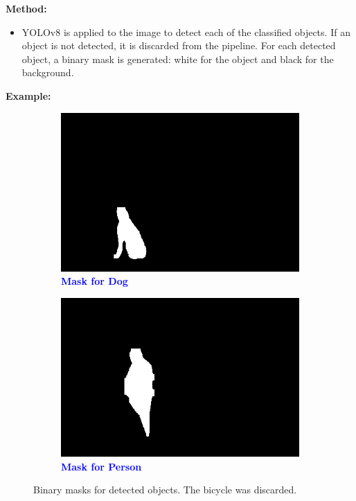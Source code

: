 \documentclass[11pt,letterpaper]{article}
\begin{document}
\textbf{Method:}
\begin{itemize}
  \item YOLOv8 is applied to the image to detect each of the classified objects. If an object is not detected, it is discarded from the pipeline. For each detected object, a binary mask is generated: white for the object and black for the background.
\end{itemize}

\noindent
\textbf{Example:}
\begin{figure}[h]
    \centering
    \begin{subfigure}[b]{0.4\textwidth}
        \centering
        \includegraphics[width=\textwidth]{midterm_report/assets/dogMask.jpg}
        \caption{\textcolor{blue}{\textbf{Mask for Dog}}}
        \label{fig:mask_dog}
    \end{subfigure}
    \hfill
    \begin{subfigure}[b]{0.4\textwidth}
        \centering
        \includegraphics[width=\textwidth]{midterm_report/assets/PersonMask.jpg}
        \caption{\textcolor{blue}{\textbf{Mask for Person}}}
        \label{fig:mask_person}
    \end{subfigure}
    \caption{Binary masks for detected objects. The bicycle was discarded.}
    \label{fig:mask_comparison}
\end{figure}
\end{document}
